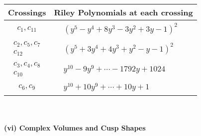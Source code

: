 \documentclass[1p]{elsarticle_modified}
\theoremstyle{definition}
\begin{document}
\begin{tabular}{m{50pt}|m{274pt}}
Crossings & \hspace{64pt}Riley Polynomials at each crossing \\
\hline $$\begin{aligned}c_{1},c_{11}\end{aligned}$$&$\begin{aligned}
&(y^5- y^4+8 y^3-3 y^2+3 y-1)^2
\end{aligned}$\\
\hline $$\begin{aligned}c_{2},c_{5},c_{7}\\c_{12}\end{aligned}$$&$\begin{aligned}
&(y^5+3 y^4+4 y^3+y^2- y-1)^2
\end{aligned}$\\
\hline $$\begin{aligned}c_{3},c_{4},c_{8}\\c_{10}\end{aligned}$$&$\begin{aligned}
&y^{10}-9 y^9+\cdots-1792 y+1024
\end{aligned}$\\
\hline $$\begin{aligned}c_{6},c_{9}\end{aligned}$$&$\begin{aligned}
&y^{10}+10 y^9+\cdots+10 y+1
\end{aligned}$\\
\hline
\end{tabular}\\~\\
\newpage\flushleft \textbf{(vi) Complex Volumes and Cusp Shapes}
\end{document}
